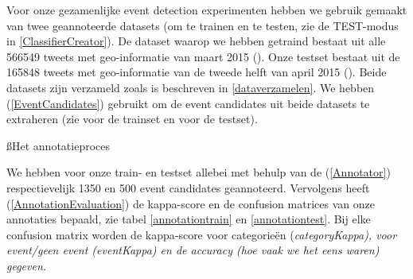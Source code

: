 {{Voor onze gezamenlijke event detection experimenten hebben we gebruik gemaakt van 
twee geannoteerde datasets (om te trainen en te testen, zie de TEST-modus in \ref{ClassifierCreator}).
De dataset waarop we hebben getraind bestaat uit alle 566549 tweets met geo-informatie van
maart 2015 (). Onze testset bestaat uit de 165848 tweets met geo-informatie
van de tweede helft van april 2015 (). Beide datasets zijn verzameld zoals is beschreven in
\ref{dataverzamelen}. We hebben  (\ref{EventCandidates}) gebruikt om de event 
candidates uit beide datasets te extraheren (zie  voor de trainset en 
 voor de testset).

\ss{Het annotatieproces}

We hebben voor onze train- en testset allebei met behulp van de  (\ref{Annotator})
respectievelijk 1350 en 500 event candidates geannoteerd. Vervolgens heeft  (\ref{AnnotationEvaluation}) 
de kappa-score en de confusion matrices van onze annotaties bepaald, zie tabel \ref{annotationtrain} en \ref{annotationtest}.
Bij elke confusion matrix worden de kappa-score voor categorie\"en (\it{categoryKappa}), voor event/geen event (\it{eventKappa}) en
de \it{accuracy} (hoe vaak we het eens waren) gegeven.

}}
